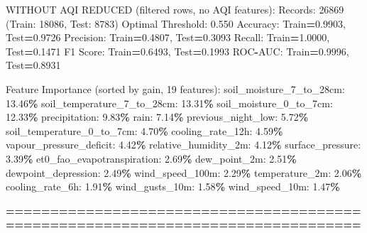 \documentclass[
  letterpaper,
  DIV=11,
  numbers=noendperiod]{scrartcl}
\newenvironment{Shaded}{\begin{snugshade}}{\end{snugshade}}
\newcommand{\BuiltInTok}[1]{#1}
\newcommand{\DecValTok}[1]{\textcolor[rgb]{0.00,0.00,0.81}{#1}}
\newcommand{\FloatTok}[1]{\textcolor[rgb]{0.00,0.00,0.81}{#1}}
\newcommand{\NormalTok}[1]{#1}
\newcommand{\OperatorTok}[1]{\textcolor[rgb]{0.81,0.36,0.00}{\textbf{#1}}}
\begin{document}
\begin{Shaded}
\begin{Highlighting}[]
\NormalTok{WITHOUT AQI REDUCED (filtered rows, no AQI features):}
\NormalTok{  Records: }\DecValTok{26869}\NormalTok{ (Train: }\DecValTok{18086}\NormalTok{, Test: }\DecValTok{8783}\NormalTok{)}
\NormalTok{  Optimal Threshold: }\FloatTok{0.550}
\NormalTok{  Accuracy: Train}\OperatorTok{=}\FloatTok{0.9903}\NormalTok{, Test}\OperatorTok{=}\FloatTok{0.9726}
\NormalTok{  Precision: Train}\OperatorTok{=}\FloatTok{0.4807}\NormalTok{, Test}\OperatorTok{=}\FloatTok{0.3093}
\NormalTok{  Recall: Train}\OperatorTok{=}\FloatTok{1.0000}\NormalTok{, Test}\OperatorTok{=}\FloatTok{0.1471}
\NormalTok{  F1 Score: Train}\OperatorTok{=}\FloatTok{0.6493}\NormalTok{, Test}\OperatorTok{=}\FloatTok{0.1993}
\NormalTok{  ROC}\OperatorTok{{-}}\NormalTok{AUC: Train}\OperatorTok{=}\FloatTok{0.9996}\NormalTok{, Test}\OperatorTok{=}\FloatTok{0.8931}

\NormalTok{  Feature Importance (}\BuiltInTok{sorted}\NormalTok{ by gain, }\DecValTok{19}\NormalTok{ features):}
\NormalTok{    soil\_moisture\_7\_to\_28cm: }\FloatTok{13.46}\OperatorTok{\%}
\NormalTok{    soil\_temperature\_7\_to\_28cm: }\FloatTok{13.31}\OperatorTok{\%}
\NormalTok{    soil\_moisture\_0\_to\_7cm: }\FloatTok{12.33}\OperatorTok{\%}
\NormalTok{    precipitation: }\FloatTok{9.83}\OperatorTok{\%}
\NormalTok{    rain: }\FloatTok{7.14}\OperatorTok{\%}
\NormalTok{    previous\_night\_low: }\FloatTok{5.72}\OperatorTok{\%}
\NormalTok{    soil\_temperature\_0\_to\_7cm: }\FloatTok{4.70}\OperatorTok{\%}
\NormalTok{    cooling\_rate\_12h: }\FloatTok{4.59}\OperatorTok{\%}
\NormalTok{    vapour\_pressure\_deficit: }\FloatTok{4.42}\OperatorTok{\%}
\NormalTok{    relative\_humidity\_2m: }\FloatTok{4.12}\OperatorTok{\%}
\NormalTok{    surface\_pressure: }\FloatTok{3.39}\OperatorTok{\%}
\NormalTok{    et0\_fao\_evapotranspiration: }\FloatTok{2.69}\OperatorTok{\%}
\NormalTok{    dew\_point\_2m: }\FloatTok{2.51}\OperatorTok{\%}
\NormalTok{    dewpoint\_depression: }\FloatTok{2.49}\OperatorTok{\%}
\NormalTok{    wind\_speed\_100m: }\FloatTok{2.29}\OperatorTok{\%}
\NormalTok{    temperature\_2m: }\FloatTok{2.06}\OperatorTok{\%}
\NormalTok{    cooling\_rate\_6h: }\FloatTok{1.91}\OperatorTok{\%}
\NormalTok{    wind\_gusts\_10m: }\FloatTok{1.58}\OperatorTok{\%}
\NormalTok{    wind\_speed\_10m: }\FloatTok{1.47}\OperatorTok{\%}

\OperatorTok{================================================================================}


\end{Highlighting}
\end{Shaded}
\end{document}
